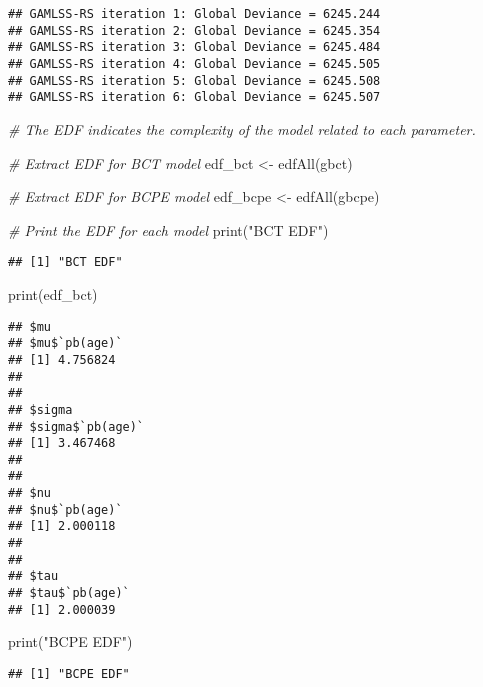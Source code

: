 \documentclass[
]{article}
\newenvironment{Shaded}{\begin{snugshade}}{\end{snugshade}}
\newcommand{\CommentTok}[1]{\textcolor[rgb]{0.56,0.35,0.01}{\textit{#1}}}
\newcommand{\FunctionTok}[1]{\textcolor[rgb]{0.00,0.00,0.00}{#1}}
\newcommand{\NormalTok}[1]{#1}
\newcommand{\OtherTok}[1]{\textcolor[rgb]{0.56,0.35,0.01}{#1}}
\newcommand{\StringTok}[1]{\textcolor[rgb]{0.31,0.60,0.02}{#1}}
\begin{document}
\begin{verbatim}
## GAMLSS-RS iteration 1: Global Deviance = 6245.244 
## GAMLSS-RS iteration 2: Global Deviance = 6245.354 
## GAMLSS-RS iteration 3: Global Deviance = 6245.484 
## GAMLSS-RS iteration 4: Global Deviance = 6245.505 
## GAMLSS-RS iteration 5: Global Deviance = 6245.508 
## GAMLSS-RS iteration 6: Global Deviance = 6245.507
\end{verbatim}

\begin{Shaded}
\begin{Highlighting}[]
\CommentTok{\# The EDF indicates the complexity of the model related to each parameter.}

\CommentTok{\# Extract EDF for BCT model}
\NormalTok{edf\_bct }\OtherTok{\textless{}{-}} \FunctionTok{edfAll}\NormalTok{(gbct)}

\CommentTok{\# Extract EDF for BCPE model}
\NormalTok{edf\_bcpe }\OtherTok{\textless{}{-}} \FunctionTok{edfAll}\NormalTok{(gbcpe)}

\CommentTok{\# Print the EDF for each model}
\FunctionTok{print}\NormalTok{(}\StringTok{"BCT EDF"}\NormalTok{)}
\end{Highlighting}
\end{Shaded}

\begin{verbatim}
## [1] "BCT EDF"
\end{verbatim}

\begin{Shaded}
\begin{Highlighting}[]
\FunctionTok{print}\NormalTok{(edf\_bct)}
\end{Highlighting}
\end{Shaded}

\begin{verbatim}
## $mu
## $mu$`pb(age)`
## [1] 4.756824
## 
## 
## $sigma
## $sigma$`pb(age)`
## [1] 3.467468
## 
## 
## $nu
## $nu$`pb(age)`
## [1] 2.000118
## 
## 
## $tau
## $tau$`pb(age)`
## [1] 2.000039
\end{verbatim}

\begin{Shaded}
\begin{Highlighting}[]
\FunctionTok{print}\NormalTok{(}\StringTok{"BCPE EDF"}\NormalTok{)}
\end{Highlighting}
\end{Shaded}

\begin{verbatim}
## [1] "BCPE EDF"
\end{verbatim}
\end{document}
